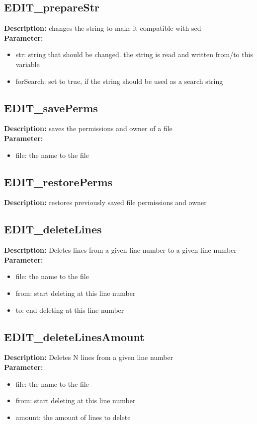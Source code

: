 \subsection{EDIT\_prepareStr}
\textbf{Description:} changes the string to make it compatible with sed\\
\textbf{Parameter:}
\begin{itemize}
\item str: string that should be changed. the string is read and written from/to this variable
\item forSearch: set to true, if the string should be used as a search string
\end{itemize}

\subsection{EDIT\_savePerms}
\textbf{Description:} saves the permissions and owner of a file\\
\textbf{Parameter:}
\begin{itemize}
\item file: the name to the file
\end{itemize}

\subsection{EDIT\_restorePerms}
\textbf{Description:} restores previously saved file permissions and owner\\

\subsection{EDIT\_deleteLines}
\textbf{Description:} Deletes lines from a given line number to a given line number\\
\textbf{Parameter:}
\begin{itemize}
\item file: the name to the file
\item from: start deleting at this line number
\item to: end deleting at this line number
\end{itemize}

\subsection{EDIT\_deleteLinesAmount}
\textbf{Description:} Deletes N lines from a given line number\\
\textbf{Parameter:}
\begin{itemize}
\item file: the name to the file
\item from: start deleting at this line number
\item amount: the amount of lines to delete
\end{itemize}

